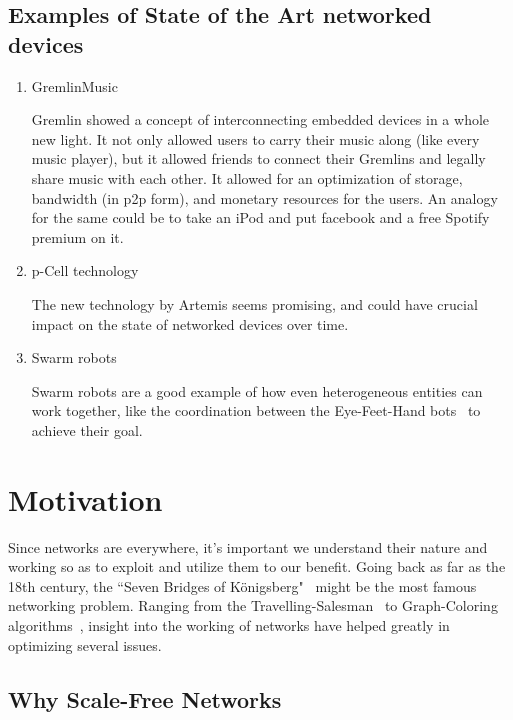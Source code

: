 \subsection{Examples of State of the Art networked devices }
\begin{enumerate}

\item GremlinMusic ~\cite{gremlin}

Gremlin showed a concept of interconnecting embedded devices in a whole new light. It not only allowed users to carry their music along (like every music player), but it allowed friends to connect their Gremlins and legally share music with each other. It allowed for an optimization of storage, bandwidth (in p2p form), and monetary resources for the users.  An analogy for the same could be to take an iPod and put facebook and a free Spotify premium on it.

\item p-Cell technology ~\cite{pCell}

The new technology by Artemis seems promising, and could have crucial impact on the state of networked devices over time.


\item Swarm robots 

Swarm robots are a good example of how even heterogeneous entities can work together, like the coordination between the Eye-Feet-Hand bots~\cite{swarm..robots} to achieve their goal.

\end{enumerate}




\section{Motivation}

Since networks are everywhere, it's important we understand their nature and working so as to exploit and utilize them to our benefit.  
Going back as far as the 18th century, the ``Seven Bridges of Königsberg"~\cite{konigsberg} might be the most famous networking problem. Ranging from the Travelling-Salesman~\cite{traveling} to Graph-Coloring algorithms~\cite{graph}, insight into the working of networks have helped greatly in optimizing several issues.

\subsection{Why Scale-Free Networks}

